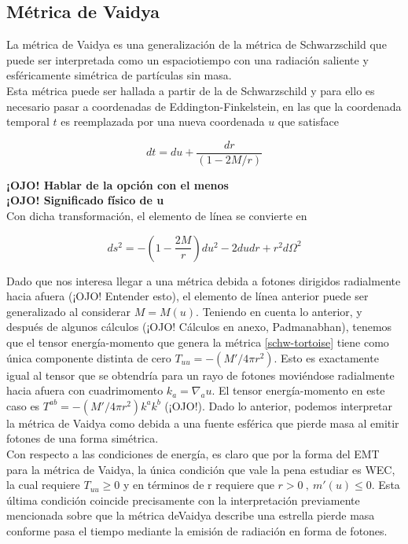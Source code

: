 \documentclass{article}
\numberwithin{equation}{section}
\begin{document}
\subsection{Métrica de Vaidya}

La métrica de Vaidya \cite{padmanabhan} es una generalización de la métrica de Schwarzschild que puede ser interpretada como un espaciotiempo con una radiación saliente y esféricamente simétrica de partículas sin masa.\\

Esta métrica puede ser hallada a partir de la de Schwarzschild y para ello es necesario pasar a coordenadas de Eddington-Finkelstein, en las que la coordenada temporal $t$ es reemplazada por una nueva coordenada $u$ que satisface

\begin{equation}
dt = du + \frac{dr}{(1 - 2M/r)}
\end{equation}

\textbf{¡OJO! Hablar de la opción con el menos}\\

\textbf{¡OJO! Significado físico de u}\\

Con dicha transformación, el elemento de línea se convierte en 

\begin{equation}
\label{schw-tortoise}
ds^2 = - \left(1- \frac{2M}{r}\right)du^2 - 2dudr + r^2d\Omega^2
\end{equation}

Dado que nos interesa llegar a una métrica debida a fotones dirigidos radialmente hacia afuera (¡OJO! Entender esto), el elemento de línea anterior puede ser generalizado al considerar $M = M(u)$. Teniendo en cuenta lo anterior, y después de algunos cálculos (¡OJO! Cálculos en anexo, Padmanabhan), tenemos que el tensor energía-momento que genera la métrica \eqref{schw-tortoise} tiene como única componente distinta de cero $T_{uu} = -(M'/4 \pi r^2)$. Esto es exactamente igual al tensor que se obtendría para un rayo de fotones moviéndose radialmente hacia afuera con cuadrimomento $k_{a} = \nabla_{a}u$. El tensor energía-momento en este caso es $T^{ab} = -(M'/4 \pi r^2)k^{a}k^{b}$ (¡OJO!). Dado lo anterior, podemos interpretar la métrica de Vaidya como debida a una fuente esférica que pierde masa al emitir fotones de una forma simétrica.\\

Con respecto a las condiciones de energía, es claro que por la forma del EMT para la métrica de Vaidya, la única condición que vale la pena estudiar es WEC, la cual requiere $T_{uu} \geq 0$ y en términos de r requiere que $r > 0\ ,\ m'(u)\leq 0 $. Esta última condición coincide precisamente con la interpretación previamente mencionada sobre que la métrica deVaidya describe una estrella pierde masa conforme pasa el tiempo mediante la emisión de radiación en forma de fotones.\\
\end{document}

